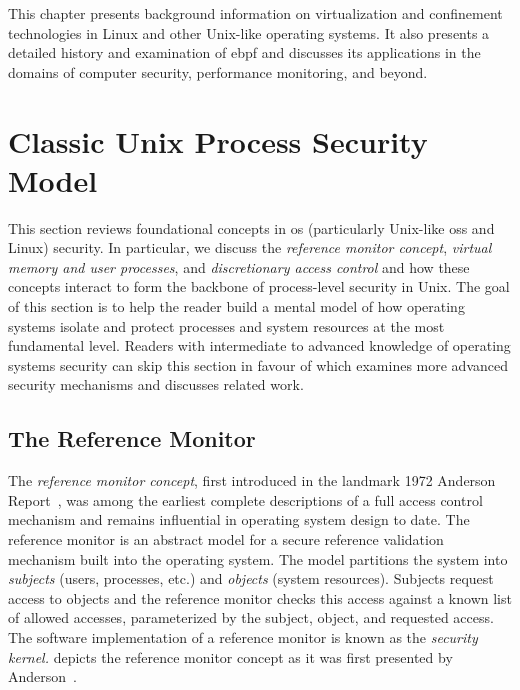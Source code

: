 \begin{inprogress}
  This chapter presents background information on virtualization and confinement
  technologies in Linux and other Unix-like operating systems. It also presents a detailed
  history and examination of \gls{ebpf} and discusses its applications in the domains of
  computer security, performance monitoring, and beyond.
\end{inprogress}

\section{Classic Unix Process Security Model}%
\label{s:virtualization-and-confinement}

This section reviews foundational concepts in \gls{os} (particularly Unix-like \gls{os}s
and Linux) security. In particular, we discuss the \textit{reference monitor concept},
\textit{virtual memory and user processes}, and \textit{discretionary access control} and
how these concepts interact to form the backbone of process-level security in Unix.  The
goal of this section is to help the reader build a mental model of how operating systems
isolate and protect processes and system resources at the most fundamental level. Readers
with intermediate to advanced knowledge of operating systems security can skip this
section in favour of  which examines more advanced security
mechanisms and discusses related work.

\subsection{The Reference Monitor}%
\label{ss:refmon}

The \textit{reference monitor concept}, first introduced in the landmark 1972 Anderson
Report~\cite{anderson1972_report}, was among the earliest complete descriptions of a full
access control mechanism and remains influential in operating system design to date. The
reference monitor is an abstract model for a secure reference validation mechanism built
into the operating system. The model partitions the system into \textit{subjects} (users,
processes, etc.) and \textit{objects} (system resources).  Subjects request access to
objects and the reference monitor checks this access against a known list of allowed
accesses, parameterized by the subject, object, and requested access. The software
implementation of a reference monitor is known as the \textit{security kernel.}
 depicts the reference monitor concept as it was first presented by
Anderson~\cite{anderson1972_report}.

